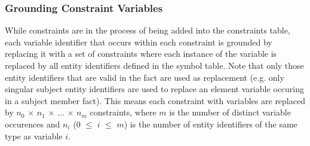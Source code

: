 \documentclass[10pt, twocolumn]{article}
\begin{document}
      \subsubsection{Grounding Constraint Variables}

        While constraints are in the process of being added into the
        constraints table, each variable identifier that occurs within each
        constraint is grounded by replacing it with a set of constraints where
        each instance of the variable is replaced by all entity identifiers
        defined in the symbol table. Note that only those entity identifiers
        that are valid in the fact are used as replacement (e.g. only singular
        subject entity identifiers are used to replace an element variable
        occuring in a subject member fact). This means each constraint with
        variables are replaced by $n_0$ $\times$ $n_1$ $\times$ $\hdots$
        $\times$ $n_m$ constraints, where $m$ is the number of distinct
        variable occurences and $n_i$ ($0$ $\leq$ $i$ $\leq$ $m$) is the
        number of entity identifiers of the same type as variable $i$.
\end{document}
